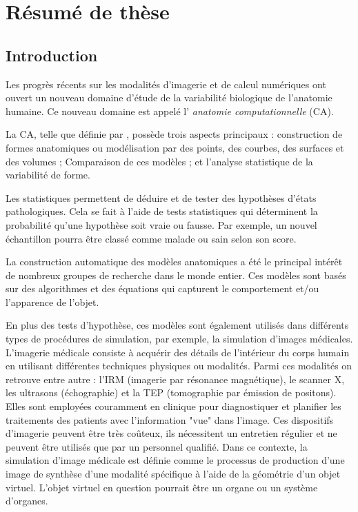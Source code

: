 \chapter{Résumé de thèse}
\label{chapter:IntroductionFR}

\section{Introduction}

Les progrès récents sur les modalités d'imagerie et de calcul numériques
ont ouvert un nouveau domaine d'étude de la variabilité biologique de l'anatomie humaine.
Ce nouveau domaine est appelé l' \textit{anatomie computationnelle} (CA).

La CA, telle que définie par \cite{Grenander1998}, possède trois aspects principaux : construction de
formes anatomiques ou modélisation par des points, des courbes, des surfaces et des volumes ;
Comparaison de ces modèles ; et l'analyse statistique de la variabilité de forme.

Les statistiques permettent de déduire et de tester des hypothèses d'états pathologiques.
Cela se fait à l'aide de tests statistiques qui déterminent la probabilité qu'une hypothèse soit vraie ou fausse.
Par exemple, un nouvel échantillon pourra être classé comme malade ou sain selon son score.

La construction automatique des modèles anatomiques
a été le principal intérêt de nombreux groupes de recherche dans le monde entier.
Ces modèles sont basés sur des algorithmes et des équations qui capturent le comportement
et/ou l'apparence de l'objet.

En plus des tests d'hypothèse, ces modèles sont également utilisés dans
différents types de procédures de simulation, par exemple, la simulation d'images médicales.
L'imagerie médicale consiste à acquérir des détails de l'intérieur du corps humain en utilisant différentes techniques physiques ou modalités.
Parmi ces modalités on retrouve entre autre : l'IRM (imagerie par résonance magnétique), le scanner X, les ultrasons (échographie) 
et la TEP (tomographie par émission de positons).
Elles sont employées couramment en clinique pour diagnostiquer et planifier les traitements des patients avec l'information "vue" dans l'image.
Ces dispositifs d'imagerie peuvent être très coûteux, ils nécessitent un entretien régulier et ne peuvent être utilisés que par un personnel qualifié.
Dans ce contexte, la simulation d'image médicale est définie comme le processus de production d'une image de synthèse
d'une modalité spécifique à l'aide de la géométrie d'un objet virtuel.
L'objet virtuel en question pourrait être un organe ou un système d'organes.

